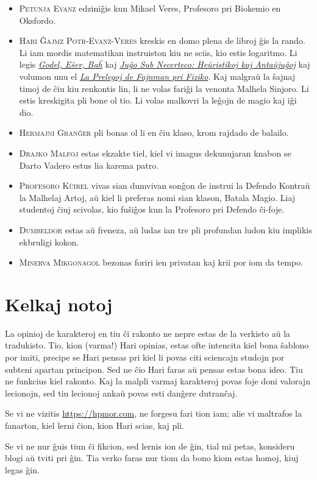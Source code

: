 \begin{itemize}
\item \textsc{Petunja Evanz} edziniĝis kun Mikael Veres, Profesoro pri Biokemio en Oksfordo.
\item \textsc{Hari Ĝajmz Potr-Evanz-Veres} kreskis en domo plena de libroj ĝis la rando.
  Li iam mordis matematikan instruiston kiu ne sciis, kio estis logaritmo.
  Li legis \href{https://books.google.com/books?vid=ISBN9780465026562}{\emph{Godel, Eŝer, Baĥ}}
  kaj \href{https://books.google.com/books?vid=ISBN9780521284141}{\emph{Juĝo Sub Necerteco: Heŭristikoj kaj Antaŭjuĝoj}}
  kaj volumon unu el \href{https://books.google.com/books?vid=ISBN9780201021158}{\emph{La Prelegoj de Fajnman pri Fiziko}}.
  Kaj malgraŭ la ŝajnaj timoj de ĉiu kiu renkontis lin, li ne volas fariĝi la venonta Malhela Sinjoro.
  Li estis kreskigita pli bone ol tio.
  Li volas malkovri la leĝojn de magio kaj iĝi dio.
\item \textsc{Hermajni Granĝer} pli bonas ol li en ĉiu klaso, krom rajdado de balailo.
\item \textsc{Drajko Malfoj} estas ekzakte tiel, kiel vi imagus dekunujaran knabon se Darto Vadero estus lia karema patro.
\item \textsc{Profesoro Kŭirel} vivas sian dumvivan sonĝon de instrui la Defendo Kontraŭ la Malhelaj Artoj, aŭ kiel li preferas nomi sian klason, Batala Magio.
  Liaj studentoj ĉiuj scivolas, kio fuŝiĝos kun la Profesoro pri Defendo ĉi-foje.
\item \textsc{Dumbeldor} estas aŭ freneza, aŭ ludas ian tre pli profundan ludon kiu implikis ekbruligi kokon.
\item \textsc{Minerva Mikgonagol} bezonas foriri ien privatan kaj krii por iom da tempo.
\end{itemize}

%
%

\section*{Kelkaj notoj}

La opinioj de karakteroj en tiu ĉi rakonto ne nepre estas de la verkisto aŭ la tradukisto.
Tio, kion (varma!) Hari opinias, estas ofte intencita kiel bona ŝablono por imiti, precipe se Hari pensas pri kiel li povas citi sciencajn studojn por subteni apartan principon.
Sed ne ĉio Hari faras aŭ pensas estas bona ideo.
Tiu ne funkcius kiel rakonto.
Kaj la malpli varmaj karakteroj povas foje doni valorajn lecionojn, sed tiu lecionoj ankaŭ povas esti danĝere dutranĉaj.

Se vi ne vizitis \url{https://hpmor.com}, ne forgesu fari tion iam; alie vi maltrafos la fanarton, kiel lerni ĉion, kion Hari scias, kaj pli.

Se vi ne nur ĝuis tiun ĉi fikcion, sed lernis ion de ĝin, tial mi petas, konsideru blogi aŭ tviti pri ĝin.
Tia verko faras nur tiom da bono kiom estas homoj, kiuj legas ĝin.

